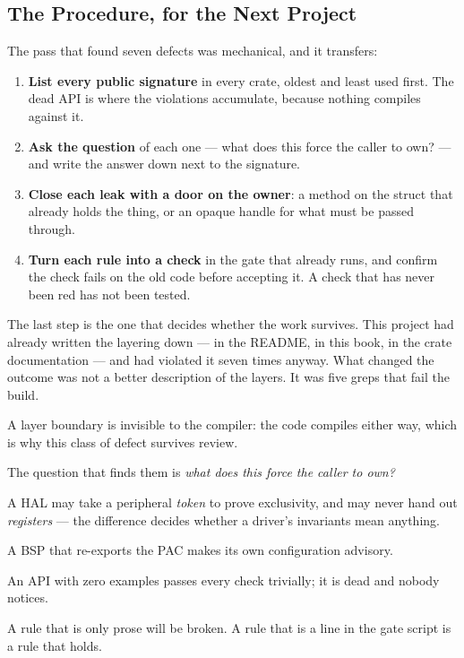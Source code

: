 \subsection{The Procedure, for the Next Project}

The pass that found seven defects was mechanical, and it transfers:

\begin{enumerate}
    \item \textbf{List every public signature} in every crate, oldest and least used first. The dead
          API is where the violations accumulate, because nothing compiles against it.
    \item \textbf{Ask the question} of each one — what does this force the caller to own? — and
          write the answer down next to the signature.
    \item \textbf{Close each leak with a door on the owner}: a method on the struct that already
          holds the thing, or an opaque handle for what must be passed through.
    \item \textbf{Turn each rule into a check} in the gate that already runs, and confirm the check
          fails on the old code before accepting it. A check that has never been red has not been
          tested.
\end{enumerate}

The last step is the one that decides whether the work survives. This project had already written
the layering down — in the README, in this book, in the crate documentation — and had violated it
seven times anyway. What changed the outcome was not a better description of the layers. It was
five greps that fail the build.

\begin{keytakeaways}
    \item A layer boundary is invisible to the compiler: the code compiles either way, which is why
          this class of defect survives review.
    \item The question that finds them is \emph{what does this force the caller to own?}
    \item A HAL may take a peripheral \emph{token} to prove exclusivity, and may never hand out
          \emph{registers} — the difference decides whether a driver's invariants mean anything.
    \item A BSP that re-exports the PAC makes its own configuration advisory.
    \item An API with zero examples passes every check trivially; it is dead and nobody notices.
    \item A rule that is only prose will be broken. A rule that is a line in the gate script is a
          rule that holds.
\end{keytakeaways}
